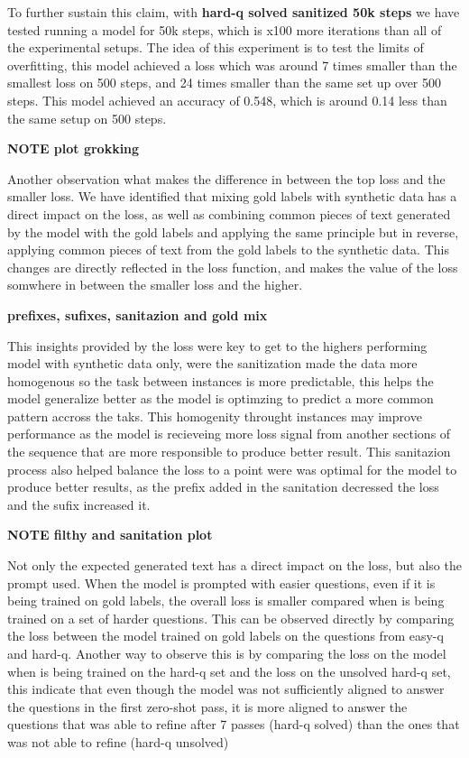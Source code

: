 \documentclass[a4paper,10pt]{article}
\begin{document}
To further sustain this claim, with \textbf{hard-q solved sanitized 50k steps} we have tested running a model for 50k steps, which is x100 more iterations than all of the experimental setups. The idea of this experiment is to test the limits of overfitting, this model achieved a loss which was around 7 times smaller than the smallest loss on 500 steps, and 24 times smaller than the same set up over 500 steps. This model achieved an accuracy of 0.548, which is around 0.14 less than the same setup on 500 steps.

\textbf{NOTE plot grokking}


Another observation what makes the difference in between the top loss and the smaller loss. We have identified that mixing gold labels with synthetic data has a direct impact on the loss, as well as combining common pieces of text generated by the model with the gold labels and applying the same principle but in reverse, applying common pieces of text from the gold labels to the synthetic data. This changes are directly reflected in the loss function, and makes the value of the loss somwhere in between the smaller loss and the higher. 


\textbf{prefixes, sufixes, sanitazion and gold mix}


This insights provided by the loss were key to get to the highers performing model with synthetic data only, were the sanitization made the data more homogenous so the task between instances is more predictable, this helps the model generalize better as the model is optimzing to predict a more common pattern accross the taks. This homogenity throught instances may improve performance as the model is recieveing more loss signal from another sections of the sequence that are more responsible to produce better result. This sanitazion process also helped balance the loss to a point were was optimal for the model to produce better results, as the prefix added in the sanitation decressed the loss and the sufix increased it.

\textbf{NOTE filthy and sanitation plot}


Not only the expected generated text has a direct impact on the loss, but also the prompt used. When the model is prompted with easier questions, even if it is being trained on gold labels, the overall loss is smaller compared when is being trained on a set of harder questions. This can be observed directly by comparing the loss between the model trained on gold labels on the questions from easy-q and hard-q. Another way to observe this is by comparing the loss on the model when is being trained on the hard-q set and the loss on the unsolved hard-q set, this indicate that even though the model was not sufficiently aligned to answer the questions in the first zero-shot pass, it is more aligned to answer the questions that was able to refine after 7 passes (hard-q solved) than the ones that was not able to refine (hard-q unsolved)
\end{document}
